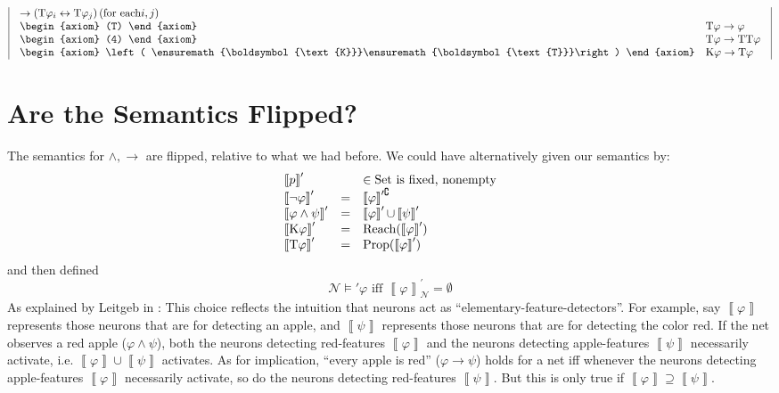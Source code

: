 \documentclass{article}
\newcommand{\infixiff}{\text{ iff }}
\newcommand{\tmmathbf}[1]{\ensuremath{\boldsymbol{#1}}}
\newcommand{\tmop}[1]{\ensuremath{\operatorname{#1}}}
\newcommand{\tmtextit}[1]{\text{{\itshape{#1}}}}
\newtheorem{axiom}{Axiom}
\providecommand{\infixiff}{\mathbin{\text{ iff }}}
\newcommand{\Net}{\ensuremath{\mathcal{N}}}
\newcommand{\Set}{\textsf{\tmop{Set}}}
\newcommand{\semantics}[1]{\left\llbracket #1 \right\rrbracket}
\newcommand{\Know}{\tmmathbf{\text{K}}}
\newcommand{\Typ}{\tmmathbf{\text{T}}}
\newcommand{\Reach}{\textsf{\tmop{Reach}}}
\newcommand{\Prop}{\textsf{\tmop{Prop}}}
\begin{document}
\[\begin{array}{|l|cc}
\begin{array}{ll}
       \rightarrow \left( \Typ \varphi_i \leftrightarrow \Typ \varphi_j
       \right)  (\textrm{\tmop{for} \tmop{each}} i, j)\\
       \begin{axiom}
         (T)
       \end{axiom} & \Typ \varphi \rightarrow \varphi\\
       \begin{axiom}
         (4)
       \end{axiom} & \Typ \varphi \rightarrow \Typ \Typ \varphi\\
       \begin{axiom}
         \left( \Know \Typ \right)
       \end{axiom} & \Know \varphi \rightarrow \Typ \varphi
     \end{array}
   \end{array} \]


\section{Are the Semantics Flipped?}

The semantics for $\wedge, \to$ are flipped, relative to what we had before.
We could have alternatively given our semantics by:
\[ \begin{array}{lcl}
     \semantics{p}' &  & \in \Set \text{ is fixed, nonempty}\\
     \semantics{\neg \varphi}' & = & \semantics{\varphi}^{\prime
     \complement}\\
     \semantics{\varphi \wedge \psi}' & = & \semantics{\varphi}'
     {\color[HTML]{000000}\cup} \semantics{\psi}'\\
     \semantics{\Know \varphi}' & = & \Reach (\semantics{\varphi}')\\
     \semantics{\Typ \varphi}' & = & \Prop (\semantics{\varphi}')
   \end{array} \]
and then defined
\[ \Net \models' \varphi \infixiff \semantics{\varphi}^{'}_{\Net} = \emptyset
\]
As explained by Leitgeb in {\citep{leitgeb2001nonmonotonic}}: This choice
reflects the intuition that neurons act as ``elementary-feature-detectors''.
For example, say $\semantics{\varphi}$ represents those neurons that are
\tmtextit{necessary} for detecting an apple, and $\semantics{\psi}$ represents
those neurons that are \tmtextit{necessary} for detecting the color red. If
the net observes a red apple ($\varphi \wedge \psi$), both the neurons
detecting red-features $\semantics{\varphi}$ and the neurons detecting
apple-features $\semantics{\psi}$ necessarily activate, i.e.
$\semantics{\varphi} \cup \semantics{\psi}$ activates. As for implication,
``every apple is red'' ($\varphi \to \psi$) holds for a net iff whenever the
neurons detecting apple-features $\semantics{\varphi}$ necessarily activate,
so do the neurons detecting red-features $\semantics{\psi}$. But this is only
true if $\semantics{\varphi} \supseteq \semantics{\psi}$.
\end{document}
